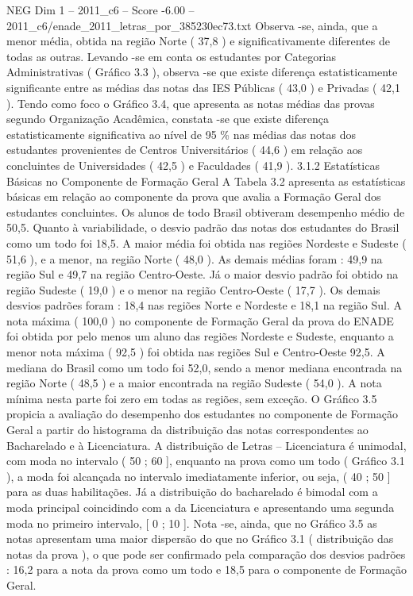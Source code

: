 \begin{textsample}{NEG Dim 1 – 2011\_c6 – Score -6.00 – 2011\_c6/enade\_2011\_letras\_por\_385230ec73.txt}
Observa -se, ainda, que a menor média, obtida na região Norte ( 37,8 ) e significativamente diferentes de todas as outras.
Levando -se em conta os estudantes por Categorias Administrativas ( Gráfico 3.3 ), observa -se que existe diferença estatisticamente significante entre as médias das notas das IES Públicas ( 43,0 ) e Privadas ( 42,1 ).
Tendo como foco o Gráfico 3.4, que apresenta as notas médias das provas segundo Organização Acadêmica, constata -se que existe diferença estatisticamente significativa ao nível de 95 \% nas médias das notas dos estudantes provenientes de Centros Universitários ( 44,6 ) em relação aos concluintes de Universidades ( 42,5 ) e Faculdades ( 41,9 ). 3.1.2 Estatísticas Básicas no Componente de Formação Geral A Tabela 3.2 apresenta as estatísticas básicas em relação ao componente da prova que avalia a Formação Geral dos estudantes concluintes.
Os alunos de todo Brasil obtiveram desempenho médio de 50,5.
Quanto à variabilidade, o desvio padrão das notas dos estudantes do Brasil como um todo foi 18,5.
A maior média foi obtida nas regiões Nordeste e Sudeste ( 51,6 ), e a menor, na região Norte ( 48,0 ).
As demais médias foram : 49,9 na região Sul e 49,7 na região Centro-Oeste.
Já o maior desvio padrão foi obtido na região Sudeste ( 19,0 ) e o menor na região Centro-Oeste ( 17,7 ).
Os demais desvios padrões foram : 18,4 nas regiões Norte e Nordeste e 18,1 na região Sul.
A nota máxima ( 100,0 ) no componente de Formação Geral da prova do ENADE foi obtida por pelo menos um aluno das regiões Nordeste e Sudeste, enquanto a menor nota máxima ( 92,5 ) foi obtida nas regiões Sul e Centro-Oeste 92,5.
A mediana do Brasil como um todo foi 52,0, sendo a menor mediana encontrada na região Norte ( 48,5 ) e a maior encontrada na região Sudeste ( 54,0 ).
A nota mínima nesta parte foi zero em todas as regiões, sem exceção.
O Gráfico 3.5 propicia a avaliação do desempenho dos estudantes no componente de Formação Geral a partir do histograma da distribuição das notas correspondentes ao Bacharelado e à Licenciatura.
A distribuição de Letras – Licenciatura é unimodal, com moda no intervalo ( 50 ; 60 ], enquanto na prova como um todo ( Gráfico 3.1 ), a moda foi alcançada no intervalo imediatamente inferior, ou seja, ( 40 ; 50 ] para as duas habilitações.
Já a distribuição do bacharelado é bimodal com a moda principal coincidindo com a da Licenciatura e apresentando uma segunda moda no primeiro intervalo, [ 0 ; 10 ].
Nota -se, ainda, que no Gráfico 3.5 as notas apresentam uma maior dispersão do que no Gráfico 3.1 ( distribuição das notas da prova ), o que pode ser confirmado pela comparação dos desvios padrões : 16,2 para a nota da prova como um todo e 18,5 para o componente de Formação Geral.

\end{textsample}
